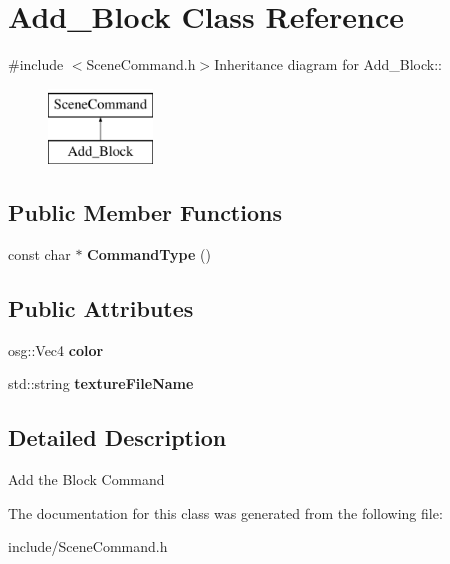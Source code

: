 \hypertarget{class_add___block}{
\section{Add\_\-Block Class Reference}
\label{class_add___block}
}


{\ttfamily \#include $<$SceneCommand.h$>$}Inheritance diagram for Add\_\-Block::\begin{figure}[H]
\begin{center}
\leavevmode
\includegraphics[height=2cm]{class_add___block}
\end{center}
\end{figure}
\subsection*{Public Member Functions}
\begin{DoxyCompactItemize}
\item 
\hypertarget{class_add___block_ae1911169719fe64601578932d8f44f2a}{
const char $\ast$ {\bfseries CommandType} ()}
\label{class_add___block_ae1911169719fe64601578932d8f44f2a}

\end{DoxyCompactItemize}
\subsection*{Public Attributes}
\begin{DoxyCompactItemize}
\item 
\hypertarget{class_add___block_ad44a8a3df7cc596edc95225d94ba695a}{
osg::Vec4 {\bfseries color}}
\label{class_add___block_ad44a8a3df7cc596edc95225d94ba695a}

\item 
\hypertarget{class_add___block_a70cf4fec4ea6e6b8d02c8885daa2d643}{
std::string {\bfseries textureFileName}}
\label{class_add___block_a70cf4fec4ea6e6b8d02c8885daa2d643}

\end{DoxyCompactItemize}


\subsection{Detailed Description}
Add the Block Command 

The documentation for this class was generated from the following file:\begin{DoxyCompactItemize}
\item 
include/SceneCommand.h\end{DoxyCompactItemize}
